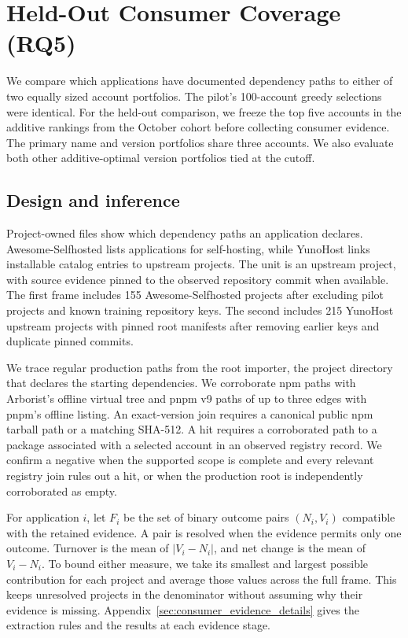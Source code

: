 \section{Held-Out Consumer Coverage (RQ5)}
\label{sec:consumer_holdout}
We compare which applications have documented dependency paths to either of two equally sized account portfolios. The pilot's 100-account greedy selections were identical. For the held-out comparison, we freeze the top five accounts in the additive rankings from the October cohort before collecting consumer evidence. The primary name and version portfolios share three accounts. We also evaluate both other additive-optimal version portfolios tied at the cutoff.

\subsection{Design and inference}
Project-owned files show which dependency paths an application declares. Awesome-Selfhosted lists applications for self-hosting, while YunoHost links installable catalog entries to upstream projects. The unit is an upstream project, with source evidence pinned to the observed repository commit when available. The first frame includes 155 Awesome-Selfhosted projects after excluding pilot projects and known training repository keys. The second includes 215 YunoHost upstream projects with pinned root manifests after removing earlier keys and duplicate pinned commits.

We trace regular production paths from the root importer, the project directory that declares the starting dependencies. We corroborate npm paths with Arborist's offline virtual tree and pnpm v9 paths of up to three edges with pnpm's offline listing. An exact-version join requires a canonical public npm tarball path or a matching SHA-512. A hit requires a corroborated path to a package associated with a selected account in an observed registry record. We confirm a negative when the supported scope is complete and every relevant registry join rules out a hit, or when the production root is independently corroborated as empty.

For application $i$, let $F_i$ be the set of binary outcome pairs $(N_i,V_i)$ compatible with the retained evidence. A pair is resolved when the evidence permits only one outcome. Turnover is the mean of $|V_i-N_i|$, and net change is the mean of $V_i-N_i$. To bound either measure, we take its smallest and largest possible contribution for each project and average those values across the full frame. This keeps unresolved projects in the denominator without assuming why their evidence is missing. Appendix~\ref{sec:consumer_evidence_details} gives the extraction rules and the results at each evidence stage.


